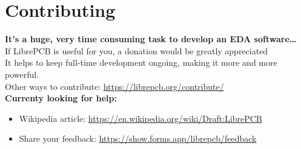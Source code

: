 \section{Contributing}

\begin{frame}{\secname}
  \begin{centering}
    \bigskip
    \textbf{\large{It's a huge, very time consuming task to develop an EDA software\ldots}}\\
    \bigskip
    If LibrePCB is useful for you, a donation would be greatly appreciated \faHeart\\
    It helps to keep full-time development ongoing, making it more and more
    powerful.\\
    \bigskip
    Other ways to contribute: \url{https://librepcb.org/contribute/}\\
    \bigskip
    \bigskip
    \textbf{Currenty looking for help:}
    \begin{itemize}
      \centering
      \item Wikipedia article: \url{https://en.wikipedia.org/wiki/Draft:LibrePCB}
      \item Share your feedback: \url{https://show.forms.app/librepcb/feedback}
    \end{itemize}
  \end{centering}
\end{frame}
